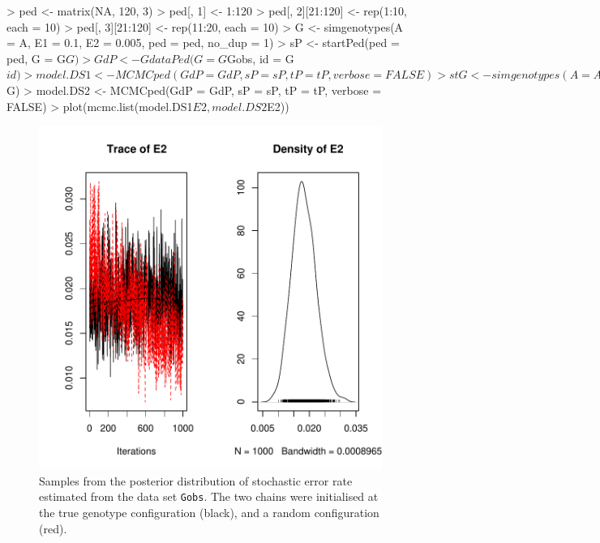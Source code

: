 \documentclass{article}
\begin{document}
\begin{Schunk}
\begin{Sinput}
> ped <- matrix(NA, 120, 3)
> ped[, 1] <- 1:120
> ped[, 2][21:120] <- rep(1:10, each = 10)
> ped[, 3][21:120] <- rep(11:20, each = 10)
> G <- simgenotypes(A = A, E1 = 0.1, E2 = 0.005, ped = ped, no_dup = 1)
> sP <- startPed(ped = ped, G = G$G)
> GdP <- GdataPed(G = G$Gobs, id = G$id)
> model.DS1 <- MCMCped(GdP = GdP, sP = sP, tP = tP, verbose = FALSE)
> stG <- simgenotypes(A = A, E1 = 0.1, E2 = 0.005, ped = ped, no_dup = 1)
> sP <- startPed(ped = ped, G = stG$G)
> model.DS2 <- MCMCped(GdP = GdP, sP = sP, tP = tP, verbose = FALSE)
> plot(mcmc.list(model.DS1$E2, model.DS2$E2))
\end{Sinput}
\end{Schunk}



\begin{figure}[!h]
\begin{center}
\includegraphics{Tutorial-051}
\end{center}
\caption{Samples from the posterior distribution of stochastic error rate estimated from the data set \texttt{Gobs}. The two chains were initialised at the true genotype configuration (black), and a random configuration (red).} 
\label{E2DS-fig}
\end{figure}
\end{document}
